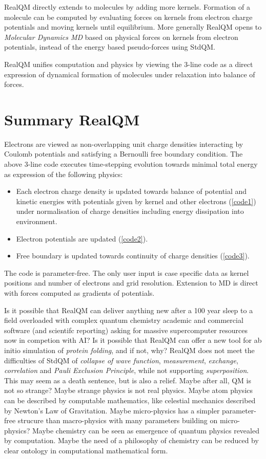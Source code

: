 \documentclass[11pt]{article} %
\begin{document}
RealQM directly extends to molecules by adding more kernels.  Formation of a molecule can be computed
by evaluating forces on kernels from electron charge potentials and moving kernels until equilibrium.  More generally RealQM opens to \emph{Molecular Dynamics MD} based on physical forces on kernels from electron potentials,  instead of the energy based pseudo-forces using StdQM.  

RealQM unifies computation and physics by viewing the 3-line code as a direct expression of dynamical formation of molecules under relaxation into balance of forces. 

\section{Summary RealQM}

Electrons are viewed as non-overlapping unit charge densities interacting by Coulomb potentials and satisfying a Bernoulli free boundary condition. The above 3-line code executes time-stepping evolution towards minimal total energy as expression of the following physics:
\begin{itemize}
\item Each electron charge density is updated towards balance of potential and kinetic energies  with potentials given by kernel and other electrons (\ref{code1}) under normalisation of charge densities including energy dissipation into environment. 
\item Electron potentials are updated (\ref{code2}).
\item Free boundary is updated towards continuity of charge densities (\ref{code3}).
\end{itemize}
The code is parameter-free.  The only user input is case specific data as kernel positions and number of electrons and grid resolution.  Extension to MD is direct with forces computed as gradients of potentials.  

Is it possible that RealQM can deliver anything new after a 100 year sleep to a field overloaded with complex quantum chemistry academic and commercial software (and scientifc reporting) asking for massive supercomputer resources now in competion with AI?  Is it possible that RealQM can offer a new tool for ab initio simulation of \emph{protein folding},  and if not,  why? RealQM does not meet the difficulties of StdQM of \emph{collapse of wave function},  \emph{measurement},  \emph{exchange}, \emph{correlation} and \emph{Pauli Exclusion Principle},  while not supporting \emph{superposition}.  This may seem as a death sentence,  but is also a relief.  Maybe after all,  QM is not so strange? Maybe strange physics is not real physics.  Maybe atom physics can be described by computable mathematics,  like celestial mechanics described by Newton's Law of Gravitation.  Maybe micro-physics has a simpler parameter-free strucure than macro-physics with many parameters building on micro-physics? Maybe chemistry can be seen as emergence of quantum physics revealed by computation.  Maybe the need of a philosophy of chemistry can be reduced by clear ontology in computational mathematical form.  
\end{document}
